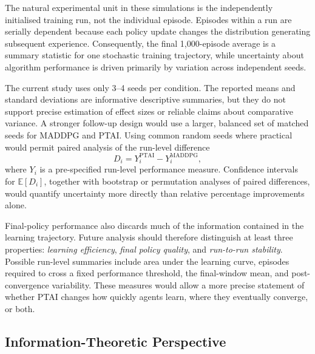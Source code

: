 \documentclass[12pt]{article}
\begin{document}
The natural experimental unit in these simulations is the independently initialised
training run, not the individual episode. Episodes within a run are serially dependent
because each policy update changes the distribution generating subsequent experience.
Consequently, the final 1,000-episode average is a summary statistic for one stochastic
training trajectory, while uncertainty about algorithm performance is driven primarily
by variation across independent seeds.

The current study uses only 3--4 seeds per condition. The reported means and standard
deviations are informative descriptive summaries, but they do not support precise
estimation of effect sizes or reliable claims about comparative variance. A stronger
follow-up design would use a larger, balanced set of matched seeds for MADDPG and PTAI.
Using common random seeds where practical would permit paired analysis of the run-level
difference
\begin{equation}
D_i = Y^{\mathrm{PTAI}}_i - Y^{\mathrm{MADDPG}}_i,
\end{equation}
where $Y_i$ is a pre-specified run-level performance measure. Confidence intervals for
$\mathbb{E}[D_i]$, together with bootstrap or permutation analyses of paired differences,
would quantify uncertainty more directly than relative percentage improvements alone.

Final-policy performance also discards much of the information contained in the learning
trajectory. Future analysis should therefore distinguish at least three properties:
\emph{learning efficiency}, \emph{final policy quality}, and \emph{run-to-run stability}.
Possible run-level summaries include area under the learning curve, episodes required to
cross a fixed performance threshold, the final-window mean, and post-convergence
variability. These measures would allow a more precise statement of whether PTAI changes
how quickly agents learn, where they eventually converge, or both.

\subsection{Information-Theoretic Perspective}
\end{document}
